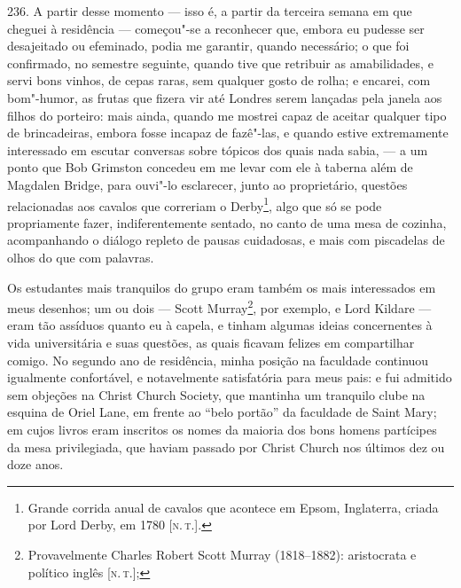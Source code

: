 236. A partir desse momento --- isso é, a partir da terceira semana em
que cheguei à residência --- começou"-se a reconhecer que, embora eu
pudesse ser desajeitado ou efeminado, podia me garantir, quando
necessário; o que foi confirmado, no semestre seguinte, quando tive que
retribuir as amabilidades, e servi bons vinhos, de cepas raras, sem
qualquer gosto de rolha; e encarei, com bom"-humor, as frutas que fizera
vir até Londres serem lançadas pela janela aos filhos do porteiro: mais
ainda, quando me mostrei capaz de aceitar qualquer tipo de brincadeiras,
embora fosse incapaz de fazê"-las, e quando estive extremamente
interessado em escutar conversas sobre tópicos dos quais nada sabia, ---
a um ponto que Bob Grimston concedeu em me levar com ele à taberna além
de Magdalen Bridge, para ouvi"-lo esclarecer, junto ao proprietário,
questões relacionadas aos cavalos que correriam o Derby\footnote{Grande
  corrida anual de cavalos que acontece em Epsom, Inglaterra, criada por
  Lord Derby, em 1780 {[}\textsc{n.\,t.}{]}.}, algo que só se pode propriamente
fazer, indiferentemente sentado, no canto de uma mesa de cozinha,
acompanhando o diálogo repleto de pausas cuidadosas, e mais com
piscadelas de olhos do que com palavras.

Os estudantes mais tranquilos do grupo eram também os mais interessados
em meus desenhos; um ou dois --- Scott Murray\footnote{Provavelmente
  Charles Robert Scott Murray (1818--1882): aristocrata e político inglês
  {[}\textsc{n.\,t.}{]};}, por exemplo, e Lord Kildare --- eram tão assíduos
quanto eu à capela, e tinham algumas ideias concernentes à vida
universitária e suas questões, as quais ficavam felizes em compartilhar
comigo. No segundo ano de residência, minha posição na faculdade
continuou igualmente confortável, e notavelmente satisfatória para meus
pais: e fui admitido sem objeções na Christ Church Society, que mantinha
um tranquilo clube na esquina de Oriel Lane, em frente ao ``belo
portão'' da faculdade de Saint Mary; em cujos livros eram inscritos os
nomes da maioria dos bons homens partícipes da mesa privilegiada, que
haviam passado por Christ Church nos últimos dez ou doze anos.

